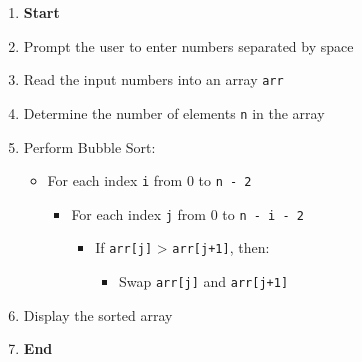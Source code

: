 \begin{enumerate}
    \item \textbf{Start}
    \item Prompt the user to enter numbers separated by space
    \item Read the input numbers into an array \texttt{arr}
    \item Determine the number of elements \texttt{n} in the array
    \item Perform Bubble Sort:
    \begin{itemize}
        \item For each index \texttt{i} from 0 to \texttt{n - 2}
        \begin{itemize}
            \item For each index \texttt{j} from 0 to \texttt{n - i - 2}
            \begin{itemize}
                \item If \texttt{arr[j]} > \texttt{arr[j+1]}, then:
                \begin{itemize}
                    \item Swap \texttt{arr[j]} and \texttt{arr[j+1]}
                \end{itemize}
            \end{itemize}
        \end{itemize}
    \end{itemize}
    \item Display the sorted array
    \item \textbf{End}
\end{enumerate}

